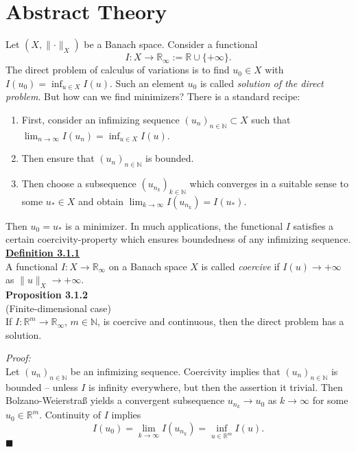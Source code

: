 \section{Abstract Theory}
Let $(X,\lVert\cdot\rVert_X)$ be a Banach space. Consider a functional
\[I:X\longrightarrow\mathbb{R}_\infty:=\mathbb{R}\cup\{+\infty\}.\]
The direct problem of calculus of variations is to find $u_0\in X$ with $I(u_0)=\inf_{u\in X}{I(u)}$. Such an element $u_0$ is called \textit{solution of the direct problem}. But how can we find minimizers? There is a standard recipe:
\begin{enumerate}
	\item First, consider an infimizing sequence $(u_n)_{n\in\mathbb{N}}\subset X$ such that $\lim_{n\to\infty}{I(u_n)}=\inf_{u\in X}{I(u)}$.
	\item Then ensure that $(u_n)_{n\in\mathbb{N}}$ is bounded.
	\item Then choose a subsequence $(u_{n_k})_{k\in\mathbb{N}}$ which converges in a suitable sense to some $u_*\in X$ and obtain $\lim_{k\to\infty}{I(u_{n_k})}=I(u_*)$.
\end{enumerate}
Then $u_0=u_*$ is a minimizer. In much applications, the functional $I$ satisfies a certain coercivity-property which ensures boundedness of any infimizing sequence.\\

\textbf{\underline{Definition 3.1.1}}\\
A functional $I:X\longrightarrow\mathbb{R}_\infty$ on a Banach space $X$ is called \textit{coercive} if $I(u)\to+\infty$ as $\lVert u\rVert_X\to+\infty$.\\[11pt]

\textbf{Proposition 3.1.2}\\
(Finite-dimensional case)\\
If $I:\mathbb{R}^m\longrightarrow\mathbb{R}_\infty$, $m\in\mathbb{N}$, is coercive and continuous, then the direct problem has a solution.\newpage

\textit{Proof:}\\
Let $(u_n)_{n\in\mathbb{N}}$ be an infimizing sequence. Coercivity implies that $(u_n)_{n\in\mathbb{N}}$ is bounded -- unless $I$ is infinity everywhere, but then the assertion it trivial. Then Bolzano-Weierstra{\ss} yields a convergent subsequence $u_{n_k}\to u_0$ as $k\to\infty$ for some $u_0\in\mathbb{R}^m$. Continuity of $I$ implies
\[I(u_0)=\lim_{k\to\infty}{I(u_{n_k})}=\inf_{u\in\mathbb{R}^m}{I(u)}.\]
\hfill$\blacksquare$\\[11pt]

